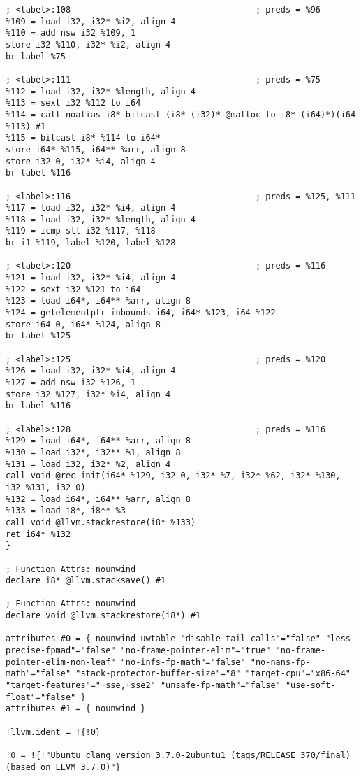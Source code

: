 \begin{verbatim}
; <label>:108                                     ; preds = %96
%109 = load i32, i32* %i2, align 4
%110 = add nsw i32 %109, 1
store i32 %110, i32* %i2, align 4
br label %75

; <label>:111                                     ; preds = %75
%112 = load i32, i32* %length, align 4
%113 = sext i32 %112 to i64
%114 = call noalias i8* bitcast (i8* (i32)* @malloc to i8* (i64)*)(i64 %113) #1
%115 = bitcast i8* %114 to i64*
store i64* %115, i64** %arr, align 8
store i32 0, i32* %i4, align 4
br label %116

; <label>:116                                     ; preds = %125, %111
%117 = load i32, i32* %i4, align 4
%118 = load i32, i32* %length, align 4
%119 = icmp slt i32 %117, %118
br i1 %119, label %120, label %128

; <label>:120                                     ; preds = %116
%121 = load i32, i32* %i4, align 4
%122 = sext i32 %121 to i64
%123 = load i64*, i64** %arr, align 8
%124 = getelementptr inbounds i64, i64* %123, i64 %122
store i64 0, i64* %124, align 8
br label %125

; <label>:125                                     ; preds = %120
%126 = load i32, i32* %i4, align 4
%127 = add nsw i32 %126, 1
store i32 %127, i32* %i4, align 4
br label %116

; <label>:128                                     ; preds = %116
%129 = load i64*, i64** %arr, align 8
%130 = load i32*, i32** %1, align 8
%131 = load i32, i32* %2, align 4
call void @rec_init(i64* %129, i32 0, i32* %7, i32* %62, i32* %130, i32 %131, i32 0)
%132 = load i64*, i64** %arr, align 8
%133 = load i8*, i8** %3
call void @llvm.stackrestore(i8* %133)
ret i64* %132
}

; Function Attrs: nounwind
declare i8* @llvm.stacksave() #1

; Function Attrs: nounwind
declare void @llvm.stackrestore(i8*) #1

attributes #0 = { nounwind uwtable "disable-tail-calls"="false" "less-precise-fpmad"="false" "no-frame-pointer-elim"="true" "no-frame-pointer-elim-non-leaf" "no-infs-fp-math"="false" "no-nans-fp-math"="false" "stack-protector-buffer-size"="8" "target-cpu"="x86-64" "target-features"="+sse,+sse2" "unsafe-fp-math"="false" "use-soft-float"="false" }
attributes #1 = { nounwind }

!llvm.ident = !{!0}

!0 = !{!"Ubuntu clang version 3.7.0-2ubuntu1 (tags/RELEASE_370/final) (based on LLVM 3.7.0)"}

\end{verbatim}